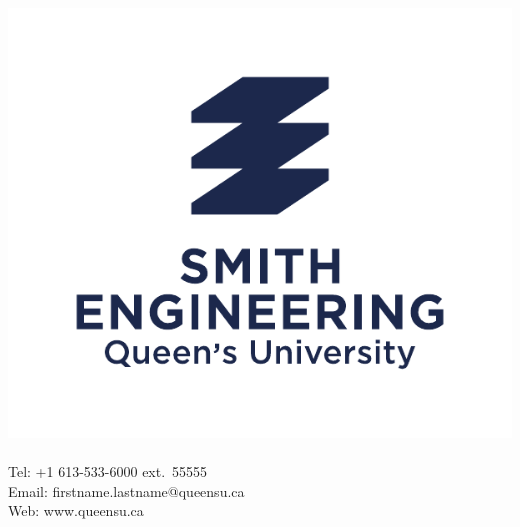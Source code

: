 \documentclass[fleqn]{qu-slides}
\begin{document}

\SmithWhiteGold
\begin{frame}[plain]
    \begin{columns}
        \centering
        \includegraphics[width=\textwidth]{logo/smith-logo-vertical.pdf}
        {\large\bf \insertauthor} \\
        \small \insertinstitute \\
        Tel: +1 613-533-6000 ext.\ 55555 \\
        Email: firstname.lastname@queensu.ca \\
        Web: www.queensu.ca
    \end{columns}
\end{frame}

\end{document}
